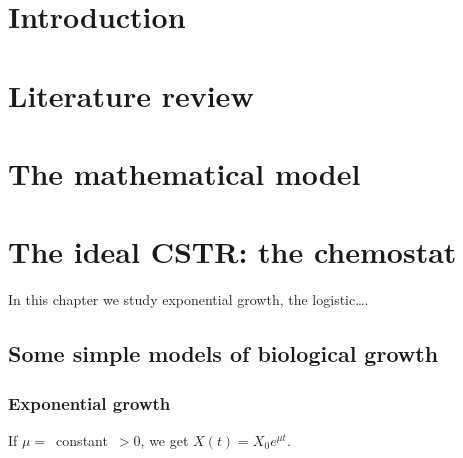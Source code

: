 \documentclass[a4paper, 10pt, twoside, openright]{book}
\begin{document}
\tableofcontents 
\begin{samepage}
\listoffigures
\let\clearpage\relax
\listoftables
\end{samepage}


\mainmatter


\chapter{Introduction}




\chapter{Literature review}



\chapter{The mathematical model}





\chapter{The ideal CSTR: the chemostat}

\textsf{%
In this chapter we study exponential growth, the logistic\ldots .}

\section{Some simple models of biological growth}

\subsection{Exponential growth}

If \mbox{$\mu =$ constant $>0$,} we get $X(t)={X}_0
{e}^{\mu t}$.
\end{document}
